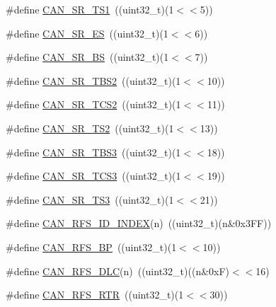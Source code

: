 \begin{DoxyCompactItemize}
\item 
\#define \hyperlink{group___c_a_n___private___macros_gaf2bffafb8e5b797b0187627a177737af}{\-C\-A\-N\-\_\-\-S\-R\-\_\-\-T\-S1}~((uint32\-\_\-t)(1$<$$<$5))
\item 
\#define \hyperlink{group___c_a_n___private___macros_ga1c3462f50fe57e646b5bd83cf4929754}{\-C\-A\-N\-\_\-\-S\-R\-\_\-\-E\-S}~((uint32\-\_\-t)(1$<$$<$6))
\item 
\#define \hyperlink{group___c_a_n___private___macros_gad92149a85dbaacccff24d8c64ad8c0a3}{\-C\-A\-N\-\_\-\-S\-R\-\_\-\-B\-S}~((uint32\-\_\-t)(1$<$$<$7))
\item 
\#define \hyperlink{group___c_a_n___private___macros_ga33d1ba06704b035fabbf3f253e31bd5b}{\-C\-A\-N\-\_\-\-S\-R\-\_\-\-T\-B\-S2}~((uint32\-\_\-t)(1$<$$<$10))
\item 
\#define \hyperlink{group___c_a_n___private___macros_ga3026226d9652696aaea7ea589e1bd0da}{\-C\-A\-N\-\_\-\-S\-R\-\_\-\-T\-C\-S2}~((uint32\-\_\-t)(1$<$$<$11))
\item 
\#define \hyperlink{group___c_a_n___private___macros_ga562836002c7b3c6abb969e62d3173e13}{\-C\-A\-N\-\_\-\-S\-R\-\_\-\-T\-S2}~((uint32\-\_\-t)(1$<$$<$13))
\item 
\#define \hyperlink{group___c_a_n___private___macros_gaadef7cf5e176d34bb303a9b7d25d9454}{\-C\-A\-N\-\_\-\-S\-R\-\_\-\-T\-B\-S3}~((uint32\-\_\-t)(1$<$$<$18))
\item 
\#define \hyperlink{group___c_a_n___private___macros_ga16e52afb875c0447e107a96b7de1e646}{\-C\-A\-N\-\_\-\-S\-R\-\_\-\-T\-C\-S3}~((uint32\-\_\-t)(1$<$$<$19))
\item 
\#define \hyperlink{group___c_a_n___private___macros_gaf9d57b9df21594aa65e48d705f64428e}{\-C\-A\-N\-\_\-\-S\-R\-\_\-\-T\-S3}~((uint32\-\_\-t)(1$<$$<$21))
\item 
\#define \hyperlink{group___c_a_n___private___macros_gac392aec22ad3737b7750bb77e173fb72}{\-C\-A\-N\-\_\-\-R\-F\-S\-\_\-\-I\-D\-\_\-\-I\-N\-D\-E\-X}(n)~((uint32\-\_\-t)(n\&0x3\-F\-F))
\item 
\#define \hyperlink{group___c_a_n___private___macros_ga3ce764619664805bd640def59318426b}{\-C\-A\-N\-\_\-\-R\-F\-S\-\_\-\-B\-P}~((uint32\-\_\-t)(1$<$$<$10))
\item 
\#define \hyperlink{group___c_a_n___private___macros_ga972eeafea01ef8b32a2209a526f07f27}{\-C\-A\-N\-\_\-\-R\-F\-S\-\_\-\-D\-L\-C}(n)~((uint32\-\_\-t)((n\&0x\-F)$<$$<$16)
\item 
\#define \hyperlink{group___c_a_n___private___macros_gac276a6ce0a89fe58afd91907438022ca}{\-C\-A\-N\-\_\-\-R\-F\-S\-\_\-\-R\-T\-R}~((uint32\-\_\-t)(1$<$$<$30))

\end{DoxyCompactItemize}
